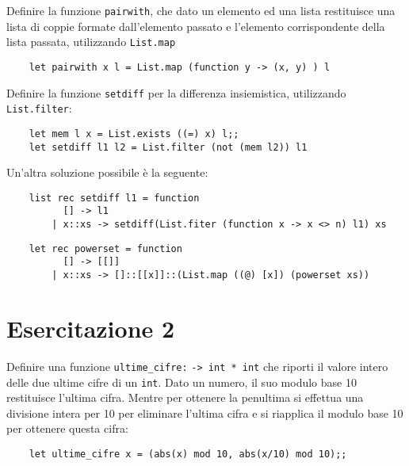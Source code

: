\documentclass{article}
\numberwithin{equation}{subsection}
\begin{document}
Definire la funzione \verb|pairwith|, che dato un elemento ed una lista restituisce una lista di coppie formate dall'elemento passato e l'elemento corrispondente della lista passata, utilizzando \verb|List.map|
\begin{verbatim}
    let pairwith x l = List.map (function y -> (x, y) ) l
\end{verbatim}

Definire la funzione \verb|setdiff| per la differenza insiemistica, utilizzando \verb|List.filter|:

\begin{verbatim}
    let mem l x = List.exists ((=) x) l;;
    let setdiff l1 l2 = List.filter (not (mem l2)) l1
\end{verbatim}

Un'altra soluzione possibile è la seguente:
\begin{verbatim}
    list rec setdiff l1 = function
          [] -> l1
        | x::xs -> setdiff(List.fiter (function x -> x <> n) l1) xs    
\end{verbatim}

\begin{verbatim}
    let rec powerset = function
          [] -> [[]]
        | x::xs -> []::[[x]]::(List.map ((@) [x]) (powerset xs))
\end{verbatim}

\clearpage

\section{Esercitazione 2}


Definire una funzione \verb|ultime_cifre:| \verb|-> int * int| che riporti il valore intero delle due ultime cifre di un \verb|int|. Dato un numero, il suo modulo base 10 restituisce l'ultima cifra. Mentre per ottenere la penultima si effettua una divisione intera per 10 per eliminare l'ultima cifra e si riapplica il modulo base 10 per ottenere questa cifra:
\begin{verbatim}
    let ultime_cifre x = (abs(x) mod 10, abs(x/10) mod 10);;
\end{verbatim}
\end{document}
